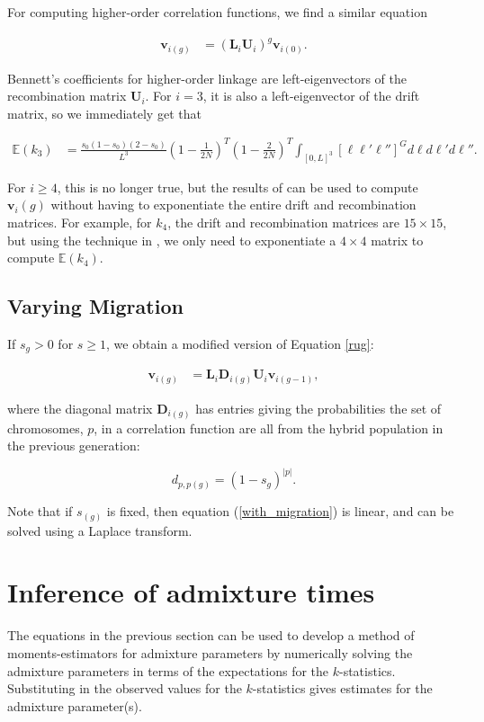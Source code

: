 \documentclass[11pt]{amsart}
\begin{document}
For computing higher-order correlation functions, we find a similar equation

\begin{align}
\mathbf{v}_{i(g)}&=
		\left(\mathbf{L}_i\mathbf{U}_i\right)^g
		\mathbf{v}_{i(0)}.
\label{rug}
\end{align}

Bennett's coefficients for higher-order linkage are left-eigenvectors of the recombination matrix $\mathbf{U}_i$. 
For $i=3$, it is also a left-eigenvector of the drift matrix, so we immediately get that 

\begin{align*}
	\mathbb{E}(k_3)&=\frac{s_0(1-s_0)(2-s_0)}{L^3}\left(1-\frac{1}{2N}\right)^T\left(1-\frac{2}{2N}\right)^T\int_{[0,L]^3}[\ell\ell'\ell'']^Gd\ell d\ell'd\ell''.
\end{align*}

For $i\geq 4$, this is no longer true, but the results of \citep{hill1974disequilibrium} can be used to compute $\textbf{v}_{i}(g)$ without having to exponentiate the entire drift and recombination matrices. For example, for $k_4$, the drift and recombination matrices are $15\times 15$, but using the technique in \citep{hill1974disequilibrium}, we only need to exponentiate a $4\times 4$ matrix to compute $\mathbb{E}(k_4)$.

\subsection*{Varying Migration}
If $s_g>0$ for $s\geq 1$, we obtain a modified version of Equation \ref{rug}:

\begin{align}
\mathbf{v}_{i(g)}&=
		\mathbf{L}_i \mathbf{D}_{i(g)}\mathbf{U}_i
		\mathbf{v}_{i(g-1)},
		\label{with_migration}
\end{align}

where the diagonal matrix $\mathbf{D}_{i(g)}$ has entries giving the probabilities the set of chromosomes, $p$, in a correlation function are all from the hybrid population in the previous generation:

$$ d_{p,p(g)} = (1-s_g)^{|p|}.$$

Note that if $s_{(g)}$ is fixed, then equation (\ref{with_migration}) is linear, and can be solved using a Laplace transform. 

\section*{Inference of admixture times}
The equations in the previous section can be used to develop a method of moments-estimators for admixture parameters by numerically solving the admixture parameters in terms of the expectations for the $k$-statistics. Substituting in the observed values for the $k$-statistics gives estimates for the admixture parameter(s). 
\end{document}
